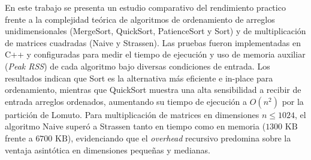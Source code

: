 En este trabajo se presenta un estudio comparativo del rendimiento
practico frente a la complejidad teórica de algoritmos de
ordenamiento de arreglos unidimensionales (MergeSort, QuickSort,
PatienceSort y Sort) y de multiplicación de matrices cuadradas
(Naive y Strassen). Las pruebas fueron implementadas en C++ y
configuradas para medir el tiempo de ejecución y uso de memoria
auxiliar (\textit{Peak RSS}) de cada algoritmo bajo diversas condiciones de entrada.
Los resultados indican que Sort es la alternativa más
eficiente e in-place para ordenamiento, mientras que QuickSort muestra
una alta sensibilidad a recibir de entrada arreglos ordenados, aumentando
su tiempo de ejecución a $O(n^2)$ por la partición de Lomuto.
Para multiplicación de matrices en dimensiones $n \le 1024$,
el algoritmo Naive superó a Strassen tanto en tiempo como en
memoria ($1300\text{ KB}$ frente a $6700\text{ KB}$),
evidenciando que el \textit{overhead} recursivo predomina
sobre la ventaja asintótica en dimensiones pequeñas y medianas.